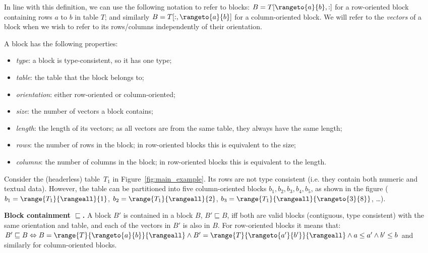 In line with this definition, we can use the following notation to refer to blocks: $B = T[\rangeto{a}{b},:]$ for a row-oriented block containing rows $a$ to $b$ in table $T$; and similarly $B = T[{:},\rangeto{a}{b}]$ for a column-oriented block.
We will refer to the \textit{vectors} of a block when we wish to refer to its rows/columns independently of their orientation.


A block has the following properties:
\begin{itemize}
\item \textit{type}: a block is type-consistent, so it has one type;
\item \textit{table}: the table that the block belongs to;
\item \textit{orientation}: either row-oriented or column-oriented;
\item \textit{size}: the number of vectors a block contains;
\item \textit{length}: the length of its vectors; as all vectors are from the same table, they always have the same length;
\item \textit{rows}: the number of rows in the block; in row-oriented blocks this is equivalent to the size;
\item \textit{columns}: the number of columns in the block; in row-oriented blocks this is equivalent to the length.
\end{itemize}

\begin{example}
Consider the (headerless) table~$T_1$ in Figure~\ref{fig:main_example}.
Its rows are not type consistent (i.e. they contain both numeric and textual data).
However, the table can be partitioned into five column-oriented blocks $b_1, b_2, b_3, b_4, b_5$, as shown in the figure ($b_1 = \range{T_1}{\rangeall}{1}$, $b_2 = \range{T_1}{\rangeall}{2}$, $b_3 = \range{T_1}{\rangeall}{\rangeto{3}{8}}$, \dots).
\end{example}

\begin{definition}
\textbf{Block containment $\sqsubseteq$.} 
A block $B'$ is contained in a block $B$, $B' \sqsubseteq B$, iff both are valid blocks (contiguous, type consistent) with the same orientation and table, and each of the vectors in $B'$ is also in $B$. For row-oriented blocks it means that: $B' \sqsubseteq B \Leftrightarrow {B=\range{T}{\rangeto{a}{b}}{\rangeall}} \wedge B'=\range{T}{\rangeto{a'}{b'}}{\rangeall} \wedge a \leq a' \wedge b' \leq b$ and similarly for column-oriented blocks.
\end{definition}

